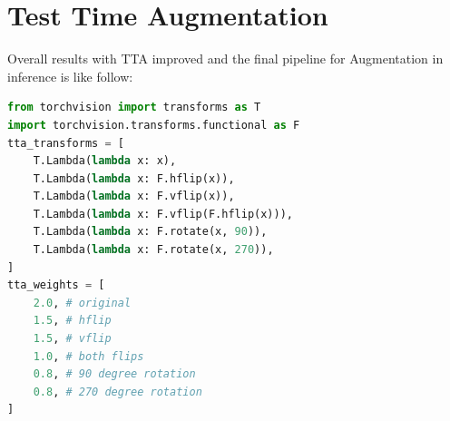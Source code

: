\documentclass[11pt,a4paper]{article}
\begin{document}
\section{Test Time Augmentation}
Overall results with TTA improved and the final pipeline for Augmentation in inference is like follow:
\begin{lstlisting}[language=Python, caption=Training Command based on Original Scripts]
from torchvision import transforms as T
import torchvision.transforms.functional as F
tta_transforms = [
    T.Lambda(lambda x: x),
    T.Lambda(lambda x: F.hflip(x)),
    T.Lambda(lambda x: F.vflip(x)),
    T.Lambda(lambda x: F.vflip(F.hflip(x))),
    T.Lambda(lambda x: F.rotate(x, 90)),
    T.Lambda(lambda x: F.rotate(x, 270)),
]
tta_weights = [
    2.0, # original
    1.5, # hflip
    1.5, # vflip
    1.0, # both flips
    0.8, # 90 degree rotation
    0.8, # 270 degree rotation
]
\end{lstlisting}
\end{document}

